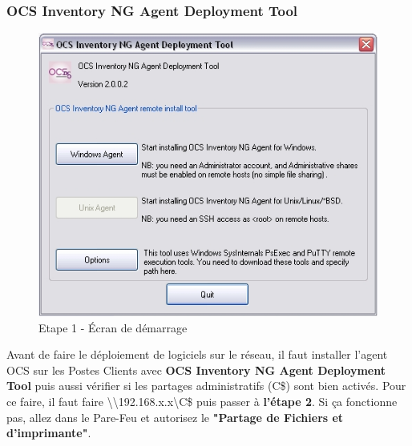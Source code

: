 \documentclass[11pt,a4paper,oneside]{article}
\begin{document}
\subsubsection{OCS Inventory NG Agent Deployment Tool}
\begin{figure}[hbtp]
\centering
\includegraphics[scale=0.5]{Script/1.jpg}
\caption{Etape 1 - Écran de démarrage}
\end{figure}
Avant de faire le déploiement de logiciels sur le réseau, il faut installer l'agent OCS sur les Postes Clients avec \textbf{OCS Inventory NG Agent Deployment Tool} puis aussi vérifier si les partages administratifs (C\$) sont bien activés. Pour ce faire, il faut faire \textbackslash\textbackslash 192.168.x.x\textbackslash C\$
 puis passer à \textbf{l'étape 2}. Si ça fonctionne pas, allez dans le Pare-Feu et autorisez le \textbf{"Partage de Fichiers et d'imprimante"}.
\newpage
\end{document}
